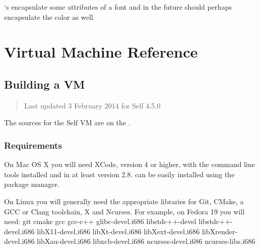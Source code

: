 \documentclass[letterpaper,10pt,english]{sphinxmanual}
\begin{document}
\begin{sphinxVerbatim}[commandchars=\\\{\}]
 
          
\end{sphinxVerbatim}

`s encapsulate some attributes of a font and in the future should perhaps encapsulate the color as well.


\chapter{Virtual Machine Reference}
\label{\detokenize{vmref:pp-vmref}}\label{\detokenize{vmref::doc}}\label{\detokenize{vmref:virtual-machine-reference}}

\section{Building a VM}
\label{\detokenize{buildvm:building-a-vm}}\label{\detokenize{buildvm::doc}}\label{\detokenize{buildvm:id1}}\begin{quote}

Last updated 3 February 2014 for Self 4.5.0
\end{quote}

The sources for the Self VM are on the .


\subsection{Requirements}
\label{\detokenize{buildvm:requirements}}
On Mac OS X you will need XCode, version 4 or higher, with the command line tools installed and  in at least version 2.8.  can be easily installed using the  package manager.

On Linux you will generally need the appropriate libraries for Git, CMake, a GCC or Clang toolchain, X and Ncurses. For example, on Fedora 19 you will need: git cmake gcc gcc-c++ glibc-devel.i686 libstdc++-devel libstdc++-devel.i686 libX11-devel.i686 libXt-devel.i686 libXext-devel.i686 libXrender-devel.i686 libXau-devel.i686 libxcb-devel.i686 ncurses-devel.i686 ncurses-libs.i686
\end{document}
